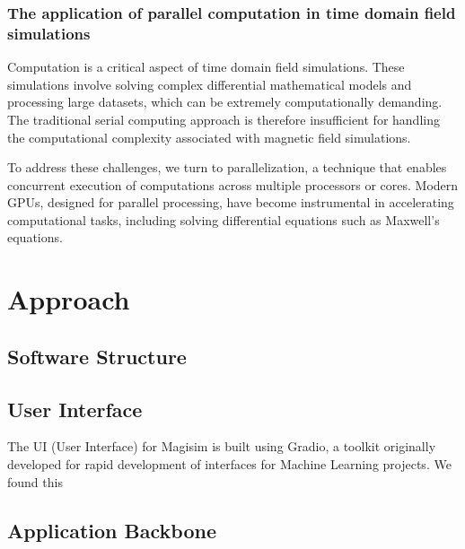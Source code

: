 \documentclass[11pt, a4paper, titlepage]{article}
\begin{document}
\subsubsection{The application of parallel computation in time domain field simulations}
Computation is a critical aspect of time domain field simulations. These simulations involve solving complex differential mathematical models and processing large datasets, which can be extremely computationally demanding. The traditional serial computing approach is therefore insufficient for handling the computational complexity associated with magnetic field simulations.

To address these challenges, we turn to parallelization, a technique that enables concurrent execution of computations across multiple processors or cores. Modern GPUs, designed for parallel processing, have become instrumental in accelerating computational tasks, including solving differential equations such as Maxwell's equations.




\fi
\newpage
\section{Approach}

\subsection{Software Structure}




\subsection{User Interface}

The UI (User Interface) for Magisim is built using Gradio, a toolkit originally developed for rapid development of interfaces for Machine Learning projects. We found this 


\subsection{Application Backbone}
\end{document}
